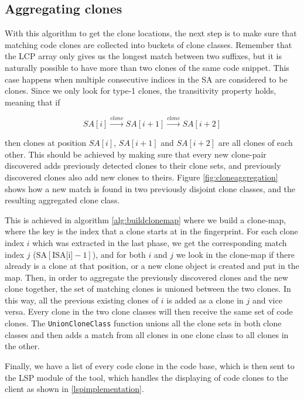 \subsection*{Aggregating clones}

With this algorithm to get the clone locations, the next step is to make sure that
matching code clones are collected into buckets of clone classes. Remember that the LCP
array only gives us the longest match between two suffixes, but it is naturally possible
to have more than two clones of the same code snippet. This case happens when multiple
consecutive indices in the SA are considered to be clones. Since we only look for type-1
clones, the transitivity property holds, meaning that if

$$
SA[i] \xrightarrow{clone} SA[i+1] \xrightarrow{clone} SA[i + 2]
$$

then clones at position $SA[i]$, $SA[i+1]$ and $SA[i + 2]$ are all clones of each other.
This should be achieved by making sure that every new clone-pair discovered adds
previously detected clones to their clone sets, and previously discovered clones also add
new clones to theirs. Figure \ref{fig:cloneaggregation} shows how a new match is found in
two previously disjoint clone classes, and the resulting aggregated clone class.

This is achieved in algorithm \ref{alg:buildclonemap} where we build a clone-map, where
the key is the index that a clone starts at in the fingerprint. For each clone index $i$
which was extracted in the last phase, we get the corresponding match index $j$
($\text{SA}[\text{ISA[i]} - 1]$), and for both $i$ and $j$ we look in the clone-map if
there already is a clone at that position, or a new clone object is created and put in the
map. Then, in order to aggregate the previously discovered clones and the new clone
together, the set of matching clones is unioned between the two clones. In this way, all
the previous existing clones of $i$ is added as a clone in $j$ and vice versa. Every clone
in the two clone classes will then receive the same set of code clones. The
\verb|UnionCloneClass| function unions all the clone sets in both clone classes and then
adds a match from all clones in one clone class to all clones in the other.

Finally, we have a list of every code clone in the code base, which is then sent to the
LSP module of the tool, which handles the displaying of code clones to the client as
shown in \cref{lspimplementation}.


